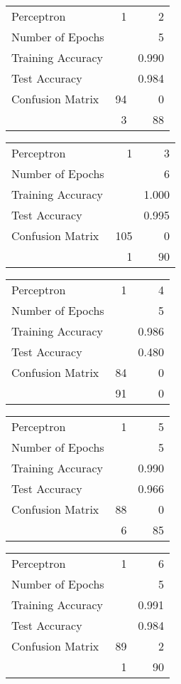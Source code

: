 \documentclass[11pt]{article}
\begin{document}
\begin{minipage}[t]{0.5\textwidth}
\begin{tabular}{|l | r r|}
\hline Perceptron & 1 & 2\\
Number of Epochs & & 5\\
Training Accuracy & & 0.990\\
Test Accuracy & & 0.984\\
Confusion Matrix & 94 & 0\\
 &3 & 88\\ \hline
\end{tabular}
\end{minipage}
\begin{minipage}[t]{0.5\textwidth}
\begin{tabular}{|l | r r|}
\hline Perceptron & 1 & 3\\
Number of Epochs & & 6\\
Training Accuracy & & 1.000\\
Test Accuracy & & 0.995\\
Confusion Matrix & 105 & 0\\
 &1 & 90\\ \hline
\end{tabular}
\end{minipage}
\begin{minipage}[t]{0.5\textwidth}
\begin{tabular}{|l | r r|}
\hline Perceptron & 1 & 4\\
Number of Epochs & & 5\\
Training Accuracy & & 0.986\\
Test Accuracy & & 0.480\\
Confusion Matrix & 84 & 0\\
 &91 & 0\\ \hline
\end{tabular}
\end{minipage}
\begin{minipage}[t]{0.5\textwidth}
\begin{tabular}{|l | r r|}
\hline Perceptron & 1 & 5\\
Number of Epochs & & 5\\
Training Accuracy & & 0.990\\
Test Accuracy & & 0.966\\
Confusion Matrix & 88 & 0\\
 &6 & 85\\ \hline
\end{tabular}
\end{minipage}
\begin{minipage}[t]{0.5\textwidth}
\begin{tabular}{|l | r r|}
\hline Perceptron & 1 & 6\\
Number of Epochs & & 5\\
Training Accuracy & & 0.991\\
Test Accuracy & & 0.984\\
Confusion Matrix & 89 & 2\\
 &1 & 90\\ \hline
\end{tabular}
\end{minipage}
\end{document}
